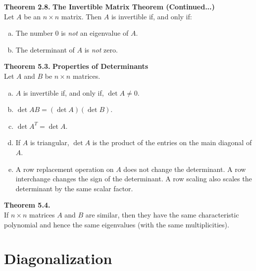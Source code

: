 \documentclass[10pt]{book}
\newenvironment{boxthm}{\begin{mdframed}[backgroundcolor=gray!30,nobreak=true]}{\end{mdframed}}
\begin{document}
\begin{boxthm}
	\textbf{Theorem 2.8.}
	\textbf{The Invertible Matrix Theorem (Continued...)} \\
	Let $A$ be an $n\times n$ matrix. Then $A$ is invertible if, and only if:
	\begin{enumerate}[(a)]\itemsep0em
		\setcounter{enumi}{18}
		\item The number 0 is \emph{not} an eigenvalue of $A$.
		\item The determinant of $A$ is \emph{not} zero.
	\end{enumerate}
\end{boxthm}
\vspace{-1ex}
\begin{boxthm}
	\textbf{Theorem 5.3.}
	\textbf{Properties of Determinants} \\
	Let $A$ and $B$ be $n\times n$ matrices.
	\begin{enumerate}[(a)]\itemsep0em
		\item $A$ is invertible if, and only if, $\det A\neq 0$.
		\item $\det AB = (\det A)(\det B)$.
		\item $\det A^T = \det A$.
		\item If $A$ is triangular, $\det A$ is the product of the entries on the main diagonal of $A$.
		\item A row replacement operation on $A$ does not change the determinant. A row interchange changes the sign of the determinant. A row scaling also scales the determinant by the same scalar factor.
	\end{enumerate}
\end{boxthm}
\vspace{-1ex}
\begin{boxthm}
	\textbf{Theorem 5.4.}  \\
	If $n\times n$ matrices $A$ and $B$ are similar, then they have the same characteristic polynomial and hence the same eigenvalues (with the same multiplicities).
\end{boxthm}
\vfill


\newpage


\section{Diagonalization}
\end{document}
